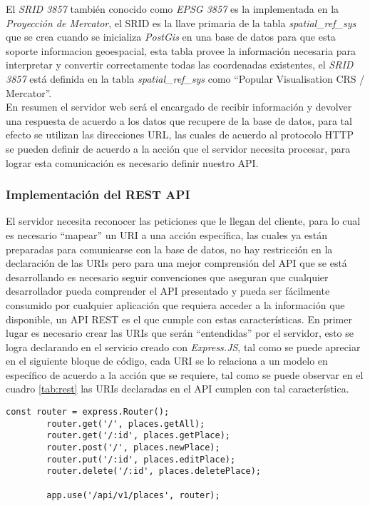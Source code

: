 El \emph{SRID 3857} también conocido como \emph{EPSG 3857} es la implementada en la \emph{Proyección de Mercator}, el SRID  es la llave primaria de la tabla \emph{spatial\_ref\_sys} que se crea cuando se inicializa \emph{PostGis} en una base de datos para que esta soporte informacion geoespacial, esta tabla provee la información necesaria para interpretar y convertir correctamente todas las coordenadas existentes, el \emph{SRID 3857} está definida en la tabla \emph{spatial\_ref\_sys} como ``Popular Visualisation CRS / Mercator''.\\

En resumen el servidor web será el encargado de recibir información y devolver una respuesta de acuerdo a los datos que recupere de la base de datos, para tal efecto se utilizan las direcciones URL, las cuales de acuerdo al protocolo HTTP se pueden definir de acuerdo a la acción que el servidor necesita procesar, para lograr esta comunicación es necesario definir nuestro API.\\


\subsubsection{Implementación del REST API}
\label{subs:Implementacion del REST API}



El servidor necesita reconocer las peticiones que le llegan del cliente, para lo cual es necesario ``mapear'' un URI a una acción específica, las cuales ya están preparadas para comunicarse con la base de datos, no hay restricción en la declaración de las URIs pero para una mejor comprensión del API que se está desarrollando es necesario seguir convenciones que aseguran que cualquier desarrollador pueda comprender el API presentado y pueda ser fácilmente consumido por cualquier aplicación que requiera acceder a la información que disponible, un API REST es el que cumple con estas características.
En primer lugar es necesario crear las URIs que serán ``entendidas'' por el servidor, esto se logra declarando en el servicio creado con \emph{Express.JS}, tal como se puede apreciar en el siguiente bloque de código, cada URI se lo relaciona a un modelo en específico de acuerdo a la acción que se requiere, tal como se puede observar en el cuadro \ref{tab:rest} las URIs declaradas en el API cumplen con tal característica.\\


\begin{center}
  \begin{lstlisting}[label=express_api,caption=Declarando API REST con ExpressJS]
        const router = express.Router();
        router.get('/', places.getAll);
        router.get('/:id', places.getPlace);
        router.post('/', places.newPlace);
        router.put('/:id', places.editPlace);
        router.delete('/:id', places.deletePlace);

        app.use('/api/v1/places', router);
  \end{lstlisting}
\end{center}


